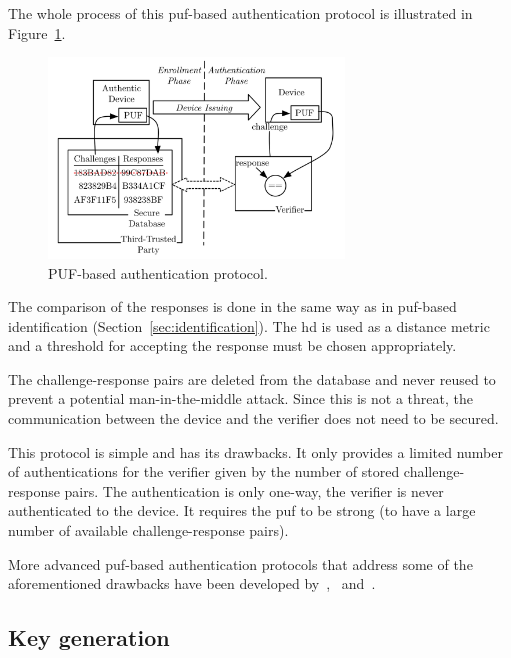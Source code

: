 The whole process of this \gls{puf}-based authentication protocol is illustrated in Figure~\ref{fig:authentication_process}.

\begin{figure}[ht!]
    \centering
    \captionsetup{justification=centering,margin=0.5cm}
    \includegraphics[width=0.7\textwidth]{images/authentication_process.png}
    \caption[PUF-based authentication protocol.]{PUF-based authentication protocol\cite{Barbareschi2018}.}
    \label{fig:authentication_process}
\end{figure}

The comparison of the responses is done in the same way as in \gls{puf}-based identification (Section~\ref{sec:identification}). The \gls{hd} is used as a distance metric and a threshold for accepting the response must be chosen appropriately.

The challenge-response pairs are deleted from the database and never reused to prevent a potential man-in-the-middle attack. Since this is not a threat, the communication between the device and the verifier does not need to be secured.

This protocol is simple and has its drawbacks. It only provides a limited number of authentications for the verifier given by the number of stored challenge-response pairs. The authentication is only one-way, the verifier is never authenticated to the device. It requires the \gls{puf} to be strong (to have a large number of available challenge-response pairs).

More advanced \gls{puf}-based authentication protocols that address some of the aforementioned drawbacks have been developed by~\cite{Maes2013},~\cite{Barbareschi2018} and~\cite{Rostami2014}.

\subsection{Key generation}

